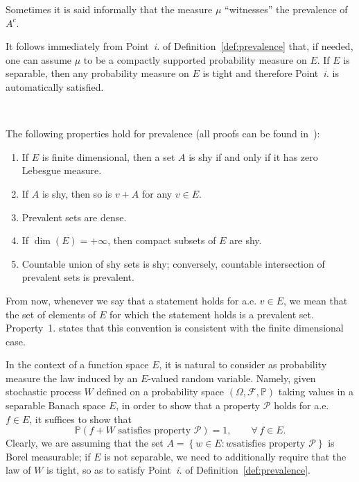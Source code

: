 \documentclass[11pt,oneside,reqno]{amsart}
\newcommand{\tmtextit}[1]{{{\itshape{#1}}}}
\newenvironment{enumeratenumeric}{\begin{enumerate}[1.] }{\end{enumerate}}
\numberwithin{equation}{section}
\begin{document}
Sometimes it is said informally that the measure $\mu$ ``witnesses'' the
prevalence of $A^c$.

It follows immediately from Point~\tmtextit{i.} of
Definition~\ref{def:prevalence} that, if needed, one can assume $\mu$ to be a
compactly supported probability measure on $E$. If $E$ is separable, then any
probability measure on $E$ is tight and therefore Point~\tmtextit{i.} is
automatically satisfied.

\

The following properties hold for prevalence (all proofs can be found
in~{\cite{huntsauer}}):
\begin{enumeratenumeric}
  \item If $E$ is finite dimensional, then a set $A$ is shy if and only if it
  has zero Lebesgue measure.
  
  \item If $A$ is shy, then so is $v + A$ for any $v \in E$.
  
  \item Prevalent sets are dense.
  
  \item If $\dim (E) = + \infty$, then compact subsets of $E$ are shy.
  
  \item Countable union of shy sets is shy; conversely, countable intersection
  of prevalent sets is prevalent. 
\end{enumeratenumeric}
From now, whenever we say that a statement holds for a.e. $v \in E$, we mean
that the set of elements of $E$ for which the statement holds is a prevalent
set. Property~1. states that this convention is consistent with the finite
dimensional case.

In the context of a function space $E$, it is natural to consider as
probability measure the law induced by an $E$\mbox{-}valued random variable.
Namely, given stochastic process $W$ defined on a probability space $(\Omega,
\mathcal{F}, \mathbb{P})$ taking values in a separable Banach space $E$, in
order to show that a property $\mathcal{P}$ holds for a.e. $f \in E$, it
suffices to show that
\[ \mathbb{P} \left( \text{$f + W$ satisfies property $\mathcal{P}$} \right) =
   1, \qquad \forall \, f \in E. \]
Clearly, we are assuming that the set $A = \left\{ w \in E : \text{$w$
satisfies property $\mathcal{P}$} \right\}$ is Borel measurable; if $E$ is not
separable, we need to additionally require that the law of $W$ is tight, so as
to satisfy Point~\tmtextit{i.} of Definition~\ref{def:prevalence}.
\end{document}
